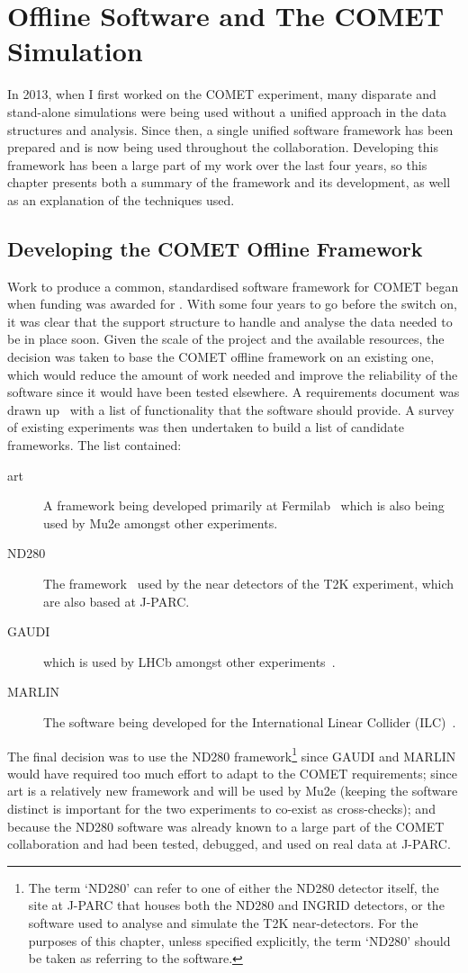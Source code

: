 
\chapter{Offline Software and The COMET Simulation}
In 2013, when I first worked on the COMET experiment, many disparate and stand-alone simulations were being used without a unified approach in the data structures and analysis.
Since then, a single unified software framework has been prepared and is now being used throughout the collaboration.
Developing this framework has been a large part of my work over the last four years, so this chapter presents both a summary of the framework and its development, as well as an explanation of the techniques used.

\section{Developing the COMET Offline Framework}
Work to produce a common, standardised software framework for COMET began when funding was awarded for \phaseI.
With some four years to go before the switch on, it was clear that the support structure to handle and analyse the data needed to be in place soon.
Given the scale of the project and the available resources, the decision was taken to base the COMET offline framework on an existing one, which would reduce the amount of work needed and improve the reliability of the software since it would have been tested elsewhere.
A requirements document was drawn up~\cite{ID:requirements} with a list of functionality that the software should provide.
A survey of existing experiments was then undertaken to build a list of candidate frameworks.
The list contained:
\begin{description}
\item [art] A framework being developed primarily at Fermilab~\cite{art:2011} which is also being used by Mu2e amongst other experiments.
\item [ND280] The framework~\cite{T2K:nim} used by the near detectors of the T2K experiment, which are also based at J-PARC.
\item [GAUDI] which is used by LHCb amongst other experiments~\cite{gaudi:2001}.
\item [MARLIN] The software being developed for the International Linear Collider (ILC)~\cite{marlin:web}.
\end{description}

The final decision was to use the ND280 framework\footnote{The term `ND280' can
refer to one of either the ND280 detector itself, the site at J-PARC that
houses both the ND280 and INGRID detectors, or the software used to analyse and
simulate the T2K near-detectors.  For the purposes of this chapter, unless
specified explicitly, the term `ND280' should be taken as referring to the
software.} 
since GAUDI and MARLIN would have required too much effort to adapt to the COMET
requirements; since art is a relatively new framework and will be used by Mu2e (keeping the software distinct is
important for the two experiments to co-exist as cross-checks); and because the
ND280 software was already known to a large part of the COMET collaboration and
had been tested, debugged, and used on real data at J-PARC.

